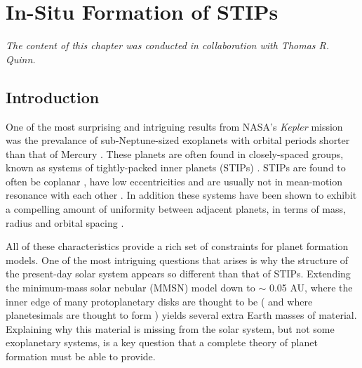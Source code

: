 \chapter {In-Situ Formation of STIPs}\label{ch:stipFinal}

\noindent \textit{The content of this chapter was conducted in collaboration with Thomas R. Quinn.}

\section{Introduction} \label{sec:intro}

One of the most surprising and intriguing results from NASA's \textit{Kepler} mission was the prevalance 
of sub-Neptune-sized exoplanets with orbital periods shorter than that of Mercury \cite{borucki10}. These 
planets are often found in closely-spaced groups, known as systems of tightly-packed inner planets (STIPs) 
\cite{latham11, lissauer11, lissauer14}. STIPs are found to often be coplanar 
\cite{fang12, tremaine12}, have low eccentricities \cite{vaneylen15, hadden17} and are usually not in 
mean-motion resonance with each other \cite{fabrycky14, steffen15}. In addition these systems have been 
shown to exhibit a compelling amount of uniformity between adjacent planets, in terms of mass, radius and 
orbital spacing \cite{millholland17, millholland21}.

All of these characteristics provide a rich set of constraints for planet formation models. One of the 
most intriguing questions that arises is why the structure of the present-day solar system appears so 
different than that of STIPs. Extending the minimum-mass solar nebular (MMSN) model \cite{hayashi81} down 
to $\sim$ 0.05 AU, where the inner edge of many protoplanetary disks are thought to be \cite{meyer97} (
and where planetesimals are thought to form \cite{mulders18}) yields several extra Earth masses of 
material. Explaining why this material is missing from the solar system, but not some exoplanetary 
systems, is a key question that a complete theory of planet formation must be able to provide.

